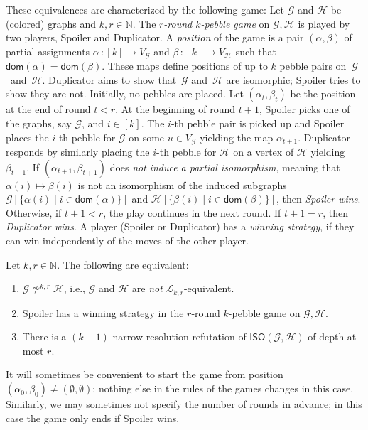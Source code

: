 \documentclass[a4paper,english, thm-restate]{lipics-v2021}
\newcommand{\defining}[1]{\emph{#1}}
\newcommand{\nat}{\mathbb{N}}
\newcommand{\kmlogic}[2]{\mathscr{L}_{#1, #2}}
\newcommand{\graphG}{\mathcal{G}}
\newcommand{\graphH}{\mathcal{H}}
\newcommand{\vertexG}{V_{\graphG}}
\newcommand{\vertexH}{V_{\graphH}}
\newcommand{\dom}{\mathsf{dom}}
\newcommand{\ISO}{\mathsf{ISO}(\graphG, \graphH)}
\newcommand{\notkequivr}[2]{\not\simeq^{#1,#2}}
\begin{document}
These equivalences are characterized by the following game:
Let $\graphG$ and $\graphH$ be (colored) graphs and $k, r \in \mathbb{N}$. The \defining{$r$-round $k$-pebble game} on $\graphG, \graphH$ is played by two players, Spoiler and Duplicator.
A \defining{position} of the game is a pair $(\alpha,\beta)$ of partial assignments $\alpha \, \colon [k] \to \vertexG$ and $\beta \, \colon [k] \to \vertexH$ such that $\dom(\alpha) = \dom(\beta)$. 
These maps define positions of up to $k$ pebble pairs on~$\graphG$~and~$\graphH$.
Duplicator aims to show that~$\graphG$ and~$\graphH$ are isomorphic; Spoiler tries to show they are not.
Initially, no pebbles are placed. Let $(\alpha_t, \beta_t)$ be the position at the end of round $t < r$. At the beginning of round $t+1$, Spoiler picks one of the graphs, say $\graphG$, and $i \in [k]$. The $i$-th pebble pair is picked up and Spoiler places the $i$-th pebble for $\graphG$ on some $u \in \vertexG$ yielding the map $\alpha_{t+1}$.
Duplicator responds by similarly placing the $i$-th pebble for $\graphH$ on a vertex of $\graphH$ yielding $\beta_{t+1}$. 
If $(\alpha_{t+1}, \beta_{t+1})$ does \emph{not} \defining{induce a partial isomorphism}, meaning that $\alpha(i) \mapsto \beta(i)$ is not an isomorphism of the induced subgraphs $\graphG[\{\alpha(i) \mid i \in \dom(\alpha)\}]$ and $\graphH[\{\beta(i) \mid i \in \dom(\beta)\}]$,
then \defining{Spoiler wins}.
Otherwise, if $t+1 <r$, the play continues in the next round.
If $t+1=r$, then \defining{Duplicator wins}.
A player (Spoiler or Duplicator) has a \defining{winning strategy},
if they can win independently of the moves of the other player.


\begin{theorem} \label{thm: logic_equiv}
Let $k,r \in \nat$. The following are equivalent:
\begin{enumerate}
\item $\graphG \notkequivr{k}{r} \graphH$, i.e., $\graphG$ and $\graphH$ are \emph{not} $\kmlogic{k}{r}$-equivalent.
\item Spoiler has a winning strategy in the $r$-round $k$-pebble game on $\graphG, \graphH$.
\item There is a $(k-1)$-narrow resolution refutation of $\ISO$ of depth at most $r$.
\end{enumerate}
\end{theorem}

\noindent It will sometimes be convenient to start the game from position $(\alpha_0, \beta_0) \neq (\emptyset, \emptyset)$; nothing else in the rules of the games changes in this case. 
Similarly, we may sometimes not specify the number of rounds in advance; in this case the game only ends if Spoiler wins. 
\end{document}

